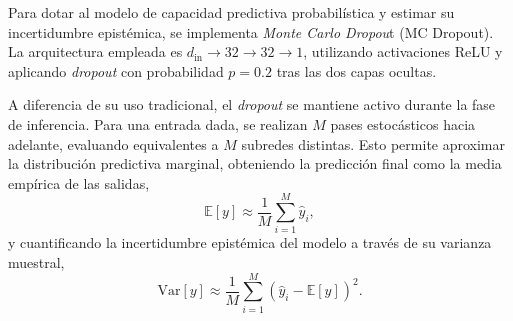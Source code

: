 \documentclass[11pt, a4paper]{article}
\begin{document}
Para dotar al modelo de capacidad predictiva probabilística y estimar su incertidumbre epistémica, se implementa \textit{Monte Carlo Dropou}t (MC Dropout). La arquitectura empleada es $d_{\text{in}} \rightarrow 32 \rightarrow 32 \rightarrow 1$, utilizando activaciones ReLU y aplicando \textit{dropout} con probabilidad $p=0.2$ tras las dos capas ocultas.

A diferencia de su uso tradicional, el \textit{dropout} se mantiene activo durante la fase de inferencia. Para una entrada dada, se realizan $M$ pases estocásticos hacia adelante, evaluando equivalentes a $M$ subredes distintas. Esto permite aproximar la distribución predictiva marginal, obteniendo la predicción final como la media empírica de las salidas, \begin{equation}
\mathbb{E}[y] \approx \frac{1}{M}\sum_{i=1}^M \hat{y}_i,
\end{equation}
y cuantificando la incertidumbre epistémica del modelo a través de su varianza muestral, \begin{equation}
\text{Var}[y] \approx \frac{1}{M}\sum_{i=1}^M (\hat{y}_i - \mathbb{E}[y])^2.
\end{equation}
\end{document}
